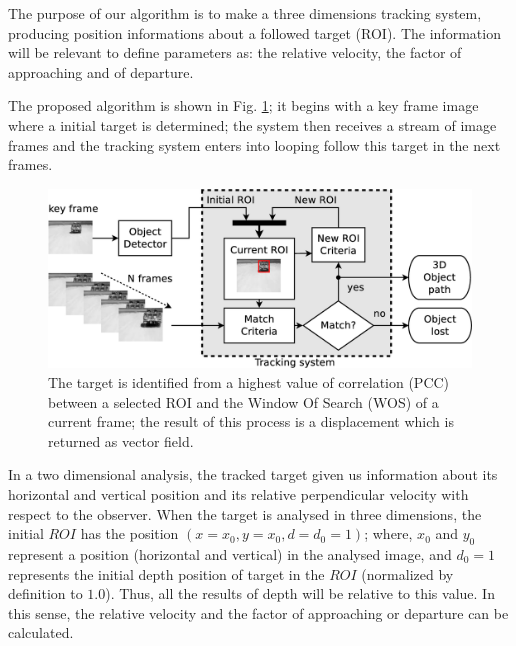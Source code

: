 The purpose of our algorithm is to make a three dimensions tracking system, producing position informations 
about a followed target (ROI).
The information will be relevant to define parameters 
as: the relative velocity, the factor of approaching and of departure.

The proposed algorithm is shown in Fig. \ref{fig:system};
it begins with a key frame image where a initial target is determined; 
the system then receives a stream of image frames and the tracking system 
enters into looping follow this target in the next frames.

\begin{figure}[bhp]
\includegraphics[width=\columnwidth]{images/figure1-diagram1.eps}
\caption{The target is identified from a highest value of correlation (PCC) between a selected ROI and 
the Window Of Search (WOS) of a current frame; the result of this process is a displacement which is  returned as vector field.}
\label{fig:system}
\end{figure}

In a two dimensional analysis, the tracked target given us information about its horizontal 
and vertical position and its relative perpendicular velocity with respect to the observer.
When the target is analysed in three dimensions, 
the initial $ROI$ has the position $(x=x_0,y=x_0,d=d_0=1)$;
where, $x_0$ and $y_0$ represent a position (horizontal and vertical) in the analysed image,
and $d_0=1$ represents the initial depth position of target in the $ROI$ (normalized by definition to $1.0$).
Thus, all the results of depth will be relative to this value. In this sense, the relative velocity and 
the factor of approaching or departure can be calculated.

